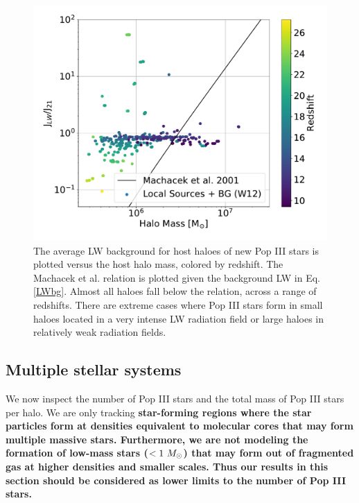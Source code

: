 \documentclass[fleqn,usenatbib]{mnras}
\begin{document}
\begin{figure}
	\includegraphics[width=\columnwidth]{images/jlw_mass_machacek_total.pdf}
	\caption{The average LW background for host haloes of new Pop III stars is plotted versus the host halo mass, colored by redshift. The Machacek et al. relation is plotted given the background LW in Eq. \ref{LWbg}. Almost all haloes fall below the relation, across a range of redshifts. There are extreme cases where Pop III stars form in small haloes located in a very intense LW radiation field or large haloes in relatively weak radiation fields.}
    \label{fig:jlw_mass_machacek}
\end{figure}

\subsection{Multiple stellar systems}

We now inspect the number of Pop III stars and the total mass of Pop III stars per halo. We are only tracking \textbf{star-forming regions where the star particles form at densities equivalent to molecular cores that may form multiple massive stars.  Furthermore, we are not modeling the formation of low-mass stars ($<1~\Ms$) that may form out of fragmented gas at higher densities and smaller scales.  Thus our results in this section should be considered as lower limits to the number of Pop III stars.}
\end{document}
